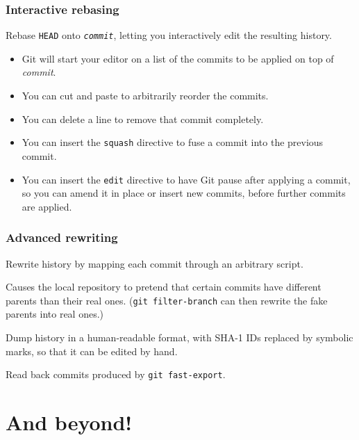 \documentclass{beamer}
\begin{document}
\begin{frame}
  \frametitle{Interactive rebasing}
  \begin{description}
  \item[\texttt{git rebase -i \textit{commit}}] Rebase \texttt{HEAD}
    onto \texttt{\textit{commit}}, letting you interactively edit the
    resulting history.
  \end{description}

  \begin{itemize}
  \item Git will start your editor on a list of the commits to be
    applied on top of \textit{commit}.
  \item You can cut and paste to arbitrarily reorder the commits.
  \item You can delete a line to remove that commit completely.
  \item You can insert the \texttt{squash} directive to fuse a commit
    into the previous commit.
  \item You can insert the \texttt{edit} directive to have Git pause
    after applying a commit, so you can amend it in place or insert
    new commits, before further commits are applied.
  \end{itemize}
\end{frame}

\begin{frame}
  \frametitle{Advanced rewriting}

  \begin{description}
  \item[\texttt{git filter-branch}] Rewrite history by mapping each
    commit through an arbitrary script.
  \item[\texttt{.git/info/grafts}] Causes the local repository to
    pretend that certain commits have different parents than their
    real ones.  (\texttt{git filter-branch} can then rewrite the fake
    parents into real ones.)
  \item[\texttt{git fast-export}] Dump history in a human-readable
    format, with SHA-1 IDs replaced by symbolic marks, so that it can
    be edited by hand.
  \item[\texttt{git fast-import}] Read back commits produced by
    \texttt{git fast-export}.
  \end{description}
\end{frame}

\section{And beyond!}
\end{document}
